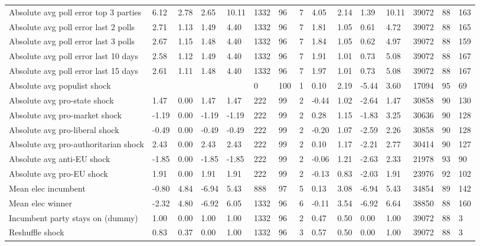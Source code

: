 \begin{longtable}{lllllllllllllll}
Absolute avg poll error top 3 parties & 6.12 & 2.78 & 2.65 & 10.11 & 1332 & 96 & 7 & 4.05 & 2.14 & 1.39 & 10.11 & 39072 & 88 & 163\\
Absolute avg poll error last 2 polls & 2.71 & 1.13 & 1.49 & 4.40 & 1332 & 96 & 7 & 1.81 & 1.05 & 0.61 & 4.72 & 39072 & 88 & 165\\
\addlinespace
Absolute avg poll error last 3 polls & 2.67 & 1.15 & 1.48 & 4.40 & 1332 & 96 & 7 & 1.84 & 1.05 & 0.62 & 4.97 & 39072 & 88 & 159\\
Absolute avg poll error last 10 days & 2.58 & 1.12 & 1.49 & 4.40 & 1332 & 96 & 7 & 1.91 & 1.01 & 0.73 & 5.08 & 39072 & 88 & 167\\
Absolute avg poll error last 15 days & 2.61 & 1.11 & 1.48 & 4.40 & 1332 & 96 & 7 & 1.97 & 1.01 & 0.73 & 5.08 & 39072 & 88 & 167\\
Absolute avg populist shock &  &  &  &  & 0 & 100 & 1 & 0.10 & 2.19 & -5.44 & 3.60 & 17094 & 95 & 69\\
Absolute avg pro-state shock & 1.47 & 0.00 & 1.47 & 1.47 & 222 & 99 & 2 & -0.44 & 1.02 & -2.64 & 1.47 & 30858 & 90 & 130\\
\addlinespace
Absolute avg pro-market shock & -1.19 & 0.00 & -1.19 & -1.19 & 222 & 99 & 2 & 0.28 & 1.15 & -1.83 & 3.25 & 30636 & 90 & 128\\
Absolute avg pro-liberal shock & -0.49 & 0.00 & -0.49 & -0.49 & 222 & 99 & 2 & -0.20 & 1.07 & -2.59 & 2.26 & 30858 & 90 & 128\\
Absolute avg pro-authoritarian shock & 2.43 & 0.00 & 2.43 & 2.43 & 222 & 99 & 2 & 0.10 & 1.17 & -2.21 & 2.77 & 30414 & 90 & 127\\
Absolute avg anti-EU shock & -1.85 & 0.00 & -1.85 & -1.85 & 222 & 99 & 2 & -0.06 & 1.21 & -2.63 & 2.33 & 21978 & 93 & 90\\
Absolute avg pro-EU shock & 1.91 & 0.00 & 1.91 & 1.91 & 222 & 99 & 2 & -0.13 & 0.83 & -2.03 & 1.91 & 23976 & 92 & 102\\
\addlinespace
Mean elec incumbent & -0.80 & 4.84 & -6.94 & 5.43 & 888 & 97 & 5 & 0.13 & 3.08 & -6.94 & 5.43 & 34854 & 89 & 142\\
Mean elec winner & -2.32 & 4.80 & -6.92 & 6.05 & 1332 & 96 & 6 & -0.11 & 3.54 & -6.92 & 6.64 & 38850 & 88 & 160\\
Incumbent party stays on (dummy) & 1.00 & 0.00 & 1.00 & 1.00 & 1332 & 96 & 2 & 0.47 & 0.50 & 0.00 & 1.00 & 39072 & 88 & 3\\
Reshuffle shock & 0.83 & 0.37 & 0.00 & 1.00 & 1332 & 96 & 3 & 0.57 & 0.50 & 0.00 & 1.00 & 39072 & 88 & 3\\

\end{longtable}
